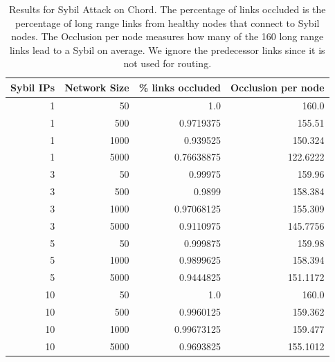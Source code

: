 \documentclass[a4paper]{article}
\begin{document}
\begin{table}[h]\small
    
    \begin{center}
        
        \begin{tabular}{|r|r|r|r|}
            \hline 
            Sybil IPs & Network Size &  \% links occluded & Occlusion per node \\ \hline
            1 & 50 & 1.0 & 160.0 \\ \hline
            1 & 500 & 0.9719375 & 155.51 \\ \hline
            1 & 1000 & 0.939525 & 150.324 \\ \hline
            1 & 5000 & 0.76638875 & 122.6222 \\ \hline
            3 & 50 & 0.99975 & 159.96 \\ \hline
            3 & 500 & 0.9899 & 158.384 \\ \hline
            3 & 1000 & 0.97068125 & 155.309 \\ \hline
            3 & 5000 & 0.9110975 & 145.7756 \\ \hline
            5 & 50 & 0.999875 & 159.98 \\ \hline
            5 & 1000 & 0.9899625 & 158.394 \\ \hline
            5 & 5000 & 0.9444825 & 151.1172 \\ \hline
            10 & 50 & 1.0 & 160.0 \\ \hline
            10 & 500 & 0.9960125 & 159.362 \\ \hline
            10 & 1000 & 0.99673125 & 159.477 \\ \hline
            10 & 5000 & 0.9693825 & 155.1012 \\ \hline
            
            
        \end{tabular}
        \label{tab:exp3}
        \caption{Results for Sybil Attack on Chord. The percentage of links occluded is the percentage of long range links from healthy nodes that connect to Sybil nodes. 
            The Occlusion per node measures how many of the 160 long range links lead to a Sybil on average.  
            We ignore the predecessor links since it is not used for routing.}
    \end{center}
    
    
    
\end{table}
\end{document}
